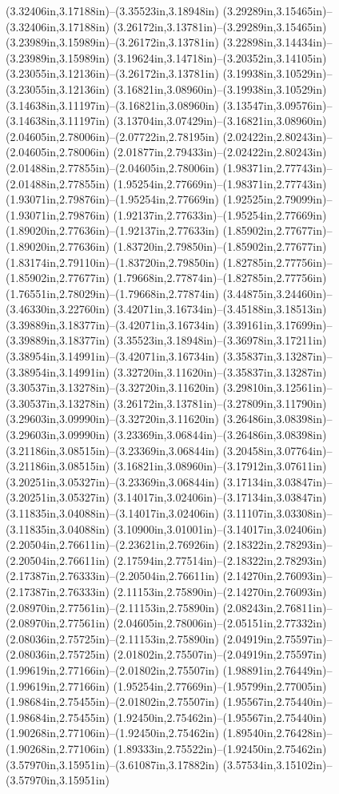 (3.32406in,3.17188in)--(3.35523in,3.18948in) (3.29289in,3.15465in)--(3.32406in,3.17188in) (3.26172in,3.13781in)--(3.29289in,3.15465in) (3.23989in,3.15989in)--(3.26172in,3.13781in) (3.22898in,3.14434in)--(3.23989in,3.15989in) (3.19624in,3.14718in)--(3.20352in,3.14105in) (3.23055in,3.12136in)--(3.26172in,3.13781in) (3.19938in,3.10529in)--(3.23055in,3.12136in) (3.16821in,3.08960in)--(3.19938in,3.10529in) (3.14638in,3.11197in)--(3.16821in,3.08960in) (3.13547in,3.09576in)--(3.14638in,3.11197in) (3.13704in,3.07429in)--(3.16821in,3.08960in) (2.04605in,2.78006in)--(2.07722in,2.78195in) (2.02422in,2.80243in)--(2.04605in,2.78006in) (2.01877in,2.79433in)--(2.02422in,2.80243in) (2.01488in,2.77855in)--(2.04605in,2.78006in) (1.98371in,2.77743in)--(2.01488in,2.77855in) (1.95254in,2.77669in)--(1.98371in,2.77743in) (1.93071in,2.79876in)--(1.95254in,2.77669in) (1.92525in,2.79099in)--(1.93071in,2.79876in) (1.92137in,2.77633in)--(1.95254in,2.77669in) (1.89020in,2.77636in)--(1.92137in,2.77633in) (1.85902in,2.77677in)--(1.89020in,2.77636in) (1.83720in,2.79850in)--(1.85902in,2.77677in) (1.83174in,2.79110in)--(1.83720in,2.79850in) (1.82785in,2.77756in)--(1.85902in,2.77677in) (1.79668in,2.77874in)--(1.82785in,2.77756in) (1.76551in,2.78029in)--(1.79668in,2.77874in) (3.44875in,3.24460in)--(3.46330in,3.22760in) (3.42071in,3.16734in)--(3.45188in,3.18513in) (3.39889in,3.18377in)--(3.42071in,3.16734in) (3.39161in,3.17699in)--(3.39889in,3.18377in) (3.35523in,3.18948in)--(3.36978in,3.17211in) (3.38954in,3.14991in)--(3.42071in,3.16734in) (3.35837in,3.13287in)--(3.38954in,3.14991in) (3.32720in,3.11620in)--(3.35837in,3.13287in) (3.30537in,3.13278in)--(3.32720in,3.11620in) (3.29810in,3.12561in)--(3.30537in,3.13278in) (3.26172in,3.13781in)--(3.27809in,3.11790in) (3.29603in,3.09990in)--(3.32720in,3.11620in) (3.26486in,3.08398in)--(3.29603in,3.09990in) (3.23369in,3.06844in)--(3.26486in,3.08398in) (3.21186in,3.08515in)--(3.23369in,3.06844in) (3.20458in,3.07764in)--(3.21186in,3.08515in) (3.16821in,3.08960in)--(3.17912in,3.07611in) (3.20251in,3.05327in)--(3.23369in,3.06844in) (3.17134in,3.03847in)--(3.20251in,3.05327in) (3.14017in,3.02406in)--(3.17134in,3.03847in) (3.11835in,3.04088in)--(3.14017in,3.02406in) (3.11107in,3.03308in)--(3.11835in,3.04088in) (3.10900in,3.01001in)--(3.14017in,3.02406in) (2.20504in,2.76611in)--(2.23621in,2.76926in) (2.18322in,2.78293in)--(2.20504in,2.76611in) (2.17594in,2.77514in)--(2.18322in,2.78293in) (2.17387in,2.76333in)--(2.20504in,2.76611in) (2.14270in,2.76093in)--(2.17387in,2.76333in) (2.11153in,2.75890in)--(2.14270in,2.76093in) (2.08970in,2.77561in)--(2.11153in,2.75890in) (2.08243in,2.76811in)--(2.08970in,2.77561in) (2.04605in,2.78006in)--(2.05151in,2.77332in) (2.08036in,2.75725in)--(2.11153in,2.75890in) (2.04919in,2.75597in)--(2.08036in,2.75725in) (2.01802in,2.75507in)--(2.04919in,2.75597in) (1.99619in,2.77166in)--(2.01802in,2.75507in) (1.98891in,2.76449in)--(1.99619in,2.77166in) (1.95254in,2.77669in)--(1.95799in,2.77005in) (1.98684in,2.75455in)--(2.01802in,2.75507in) (1.95567in,2.75440in)--(1.98684in,2.75455in) (1.92450in,2.75462in)--(1.95567in,2.75440in) (1.90268in,2.77106in)--(1.92450in,2.75462in) (1.89540in,2.76428in)--(1.90268in,2.77106in) (1.89333in,2.75522in)--(1.92450in,2.75462in) (3.57970in,3.15951in)--(3.61087in,3.17882in) (3.57534in,3.15102in)--(3.57970in,3.15951in) 